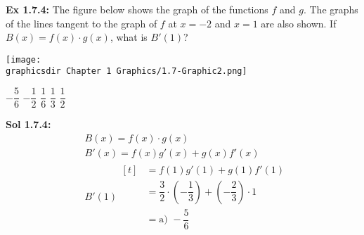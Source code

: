 \begin{tcolorbox}[example]
    \textbf{Ex 1.7.4: } The figure below shows the graph of the functions $f$ and $g$. The graphs of the lines tangent to the graph of $f$ at $x = -2$ and $x = 1$ are also shown. If $B(x) = f(x) \cdot g(x)$, what is $B'(1)$? \\

    \begin{center}
        \texttt{[image: \\graphicsdir Chapter 1 Graphics/1.7-Graphic2.png]}
    \end{center} \vspace{11pt}

    \begin{oneparchoices}
        \choice $-\dfrac{5}{6}$
        \choice $-\dfrac{1}{2}$
        \choice $\dfrac{1}{6}$
        \choice $\dfrac{1}{3}$
        \choice $\dfrac{1}{2}$
    \end{oneparchoices}
\end{tcolorbox}
\begin{tcolorbox}[solution]
    \textbf{Sol 1.7.4: } \begin{align*}
        & B(x) = f(x) \cdot g(x) \\[11pt]
        & B'(x) = f(x)g'(x) + g(x)f'(x) \\[11pt]
        & B'(1) \begin{aligned}[t]
            & = f(1)g'(1) + g(1)f'(1) \\[11pt]
            & = \dfrac{3}{2} \cdot \left(-\dfrac{1}{3}\right) + \left(-\dfrac{2}{3}\right) \cdot 1 \\[11pt]
            & = \boxed{\text{a) } -\dfrac{5}{6}}
        \end{aligned}
    \end{align*}
\end{tcolorbox} \vspace{11pt}

